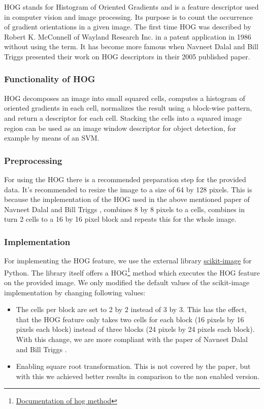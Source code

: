 \documentclass{scrartcl}
\begin{document}
HOG stands for Histogram of Oriented Gradients and is a feature descriptor used in computer vision and image processing. Its purpose is to count the occurrence of gradient orientations in a given image. The first time HOG was described by Robert K. McConnell of Wayland Research Inc. in a patent application in 1986 without using the term. It has become more famous when Navneet Dalal and Bill Triggs \cite{Hog_article} presented their work on HOG descriptors in their 2005 published paper.

\subsubsection{Functionality of HOG}

HOG decomposes an image into small squared cells, computes a histogram of oriented gradients in each cell, normalizes the result using a block-wise pattern, and return a descriptor for each cell. Stacking the cells into a squared image region can be used as an image window descriptor for object detection, for example by means of an SVM.

\subsubsection{Preprocessing}

For using the HOG there is a recommended preparation step for the provided data. It's recommended to resize the image to a size of 64 by 128 pixels. This is because the implementation of the HOG used in the above mentioned paper of Navneet Dalal and Bill Triggs \cite[p. 4]{Hog_article}, combines 8 by 8 pixels to a cells, combines in turn 2 cells to a 16 by 16 pixel block and repeats this for the whole image.

\subsubsection{Implementation}

For implementing the HOG feature, we use the external library \href{https://scikit-image.org/}{scikit-image} for Python. The library itself offers a HOG\footnote{\href{https://scikit-image.org/docs/dev/auto_examples/features_detection/plot_hog.html}{Documentation of hog method}} method which executes the HOG feature on the provided image. We only modified the default values of the scikit-image implementation by changing following values:
\begin{itemize}
  \item The cells per block are set to 2 by 2 instead of 3 by 3. This has the effect, that the HOG feature only takes two cells for each block (16 pixels by 16 pixels each block) instead of three blocks (24 pixels by 24 pixels each block). With this change, we are more compliant with the paper of Navneet Dalal and Bill Triggs \cite[p. 4]{Hog_article}.
  \item Enabling square root transformation. This is not covered by the paper, but with this we achieved better results in comparison to the non enabled version.
\end{itemize}
\end{document}
